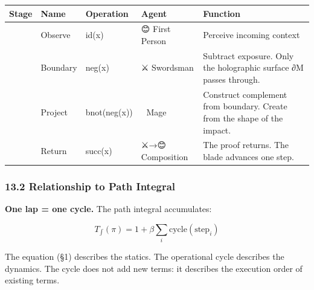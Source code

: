 \documentclass[
]{article}
\newcounter{none} %
\begin{document}
{\def\LTcaptype{none} %
\begin{longtable}[]{@{}
  >{\raggedright\arraybackslash}p{}
  >{\raggedright\arraybackslash}p{}
  >{\raggedright\arraybackslash}p{}
  >{\raggedright\arraybackslash}p{}
  >{\raggedright\arraybackslash}p{}@{}}
\toprule\noalign{}
\begin{minipage}[b]{\linewidth}\raggedright
Stage
\end{minipage} & \begin{minipage}[b]{\linewidth}\raggedright
Name
\end{minipage} & \begin{minipage}[b]{\linewidth}\raggedright
Operation
\end{minipage} & \begin{minipage}[b]{\linewidth}\raggedright
Agent
\end{minipage} & \begin{minipage}[b]{\linewidth}\raggedright
Function
\end{minipage} \\
\midrule\noalign{}
\endhead
\bottomrule\noalign{}
\endlastfoot
1 & Observe & id(x) & 😊 First Person & Perceive incoming context \\
2 & Boundary & neg(x) & ⚔️ Swordsman & Subtract exposure. Only the
holographic surface ∂M passes through. \\
3 & Project & bnot(neg(x)) & 🧙 Mage & Construct complement from
boundary. Create from the shape of the impact. \\
4 & Return & succ(x) & ⚔️→😊 Composition & The proof returns. The blade
advances one step. \\
\end{longtable}
}

\subsubsection{13.2 Relationship to Path
Integral}\label{relationship-to-path-integral}

\textbf{One lap = one cycle.} The path integral accumulates:

\[T_\int(\pi) = 1 + \beta \sum_i \text{cycle}(\text{step}_i)\]

The equation (§1) describes the statics. The operational cycle describes
the dynamics. The cycle does not add new terms: it describes the
execution order of existing terms.
\end{document}
